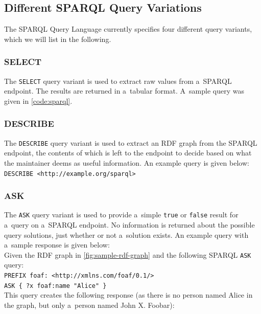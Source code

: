\subsection{Different SPARQL Query Variations}

The SPARQL Query Language currently specifies four different query variants, which we will list in the following.

\subsubsection{SELECT}

The \texttt{SELECT} query variant is used to extract
raw values from a~SPARQL endpoint.
The results are returned in a~tabular format.
A~sample query was given in \autoref{code:sparql}.

\subsubsection{DESCRIBE}

The \texttt{DESCRIBE} query variant is used to extract
an RDF graph from the SPARQL endpoint,
the contents of which is left to the endpoint to decide
based on what the maintainer deems as useful information.
An example query is given below:\\

\texttt{DESCRIBE <http://example.org/sparql>}

\subsubsection{ASK}

The \texttt{ASK} query variant is used to provide
a~simple \texttt{true} or \texttt{false} result
for a~query on a~SPARQL endpoint.
No information is returned about the possible query solutions,
just whether or not a~solution exists.
An example query with a~sample response is given below:\\

\noindent Given the RDF graph in \autoref{fig:sample-rdf-graph}
and the following SPARQL \texttt{ASK} query:\\

\texttt{PREFIX foaf: <http://xmlns.com/foaf/0.1/>\\
\indent ASK \{ ?x foaf:name  "Alice" \}}\\

\noindent This query creates the following response
(as there is no person named Alice in the graph,
but only a~person named John X. Foobar):\\

